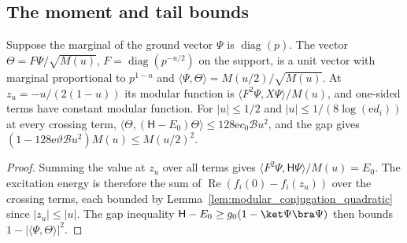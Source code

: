\subsection{The moment and tail bounds}
\label{sec:marginal_tails_main}

\begin{lemma}
    \label{lem:marginal_tilt}
    \leanok
    Suppose the marginal of the ground vector $\Psi$ is $\operatorname{diag}(p)$.
    The vector $\Theta=F\Psi/\sqrt{M(u)}$, $F=\operatorname{diag}(p^{-u/2})$ on
    the support, is a unit vector with marginal proportional to $p^{1-u}$ and
    $\langle\Psi,\Theta\rangle=M(u/2)/\sqrt{M(u)}$. At
    $z_u=-u/(2(1-u))$ its modular function is $\langle F^2\Psi,X\Psi\rangle/M(u)$,
    and one-sided terms have constant modular function. For
    $|u|\le1/2$ and $|u|\le1/(8\log(\mathrm ed_i))$ at every crossing term,
    $\langle\Theta,(\mathsf H-E_0)\Theta\rangle\le128\mathrm ec_0\mathcal Bu^2$,
    and the gap gives $(1-128\mathrm e\vartheta\mathcal Bu^2)M(u)\le M(u/2)^2$.
\end{lemma}
\begin{proof}\leanok
    Summing the value at $z_u$ over all terms gives
    $\langle F^2\Psi,\mathsf H\Psi\rangle/M(u)=E_0$. The excitation energy is
    therefore the sum of $\operatorname{Re}(f_i(0)-f_i(z_u))$ over the crossing
    terms, each bounded by Lemma~\ref{lem:modular_conjugation_quadratic}
    since $|z_u|\le|u|$. The gap inequality
    $\mathsf H-E_0\ge g_0(1-\ket\Psi\bra\Psi)$ then bounds
    $1-|\langle\Psi,\Theta\rangle|^2$.
\end{proof}

